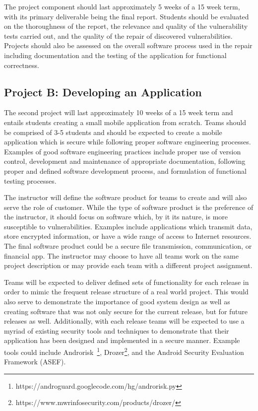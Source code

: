 \documentclass{sig-alternate}
\begin{document}
The project component should last approximately 5 weeks of a 15 week term, with its primary deliverable being the final report. Students should be evaluated on the thoroughness of the report, the relevance and quality of the vulnerability tests carried out, and the quality of the repair of discovered vulnerabilities. Projects should also be assessed on the overall software process used in the repair including documentation and the testing of the application for functional correctness.

\subsection{Project B: Developing an Application}

The second project will last approximately 10 weeks of a 15 week term and entails students creating a small mobile application from scratch. Teams should be comprised of 3-5 students and should be expected to create a mobile application which is secure while following proper software engineering processes. Examples of good software engineering practices include proper use of version control, development and maintenance of appropriate documentation, following proper and defined software development process, and formulation of functional testing processes.

The instructor will define the software product for teams to create and will also serve the role of customer. While the type of software product is the preference of the instructor, it should focus on software which, by it its nature, is more susceptible to vulnerabilities. Examples include applications which transmit data, store encrypted information, or have a wide range of access to Internet resources. The final software product could be a secure file transmission, communication, or financial app. The instructor may choose to have all teams work on the same project description or may provide each team with a different project assignment.

Teams will be expected to deliver defined sets of functionality for each release in order to mimic the frequent release structure of a real world project. This would also serve to demonstrate the importance of good system design as well as creating software that was not only secure for the current release, but for future releases as well. Additionally, with each release teams will be expected to use a myriad of existing security tools and techniques to demonstrate that their application has been designed and implemented in a secure manner.  Example tools could include Androrisk~\footnote{https://androguard.googlecode.com/hg/androrisk.py}, Drozer\footnote{https://www.mwrinfosecurity.com/products/drozer/}, and the Android Security Evaluation Framework (ASEF).
\end{document}
